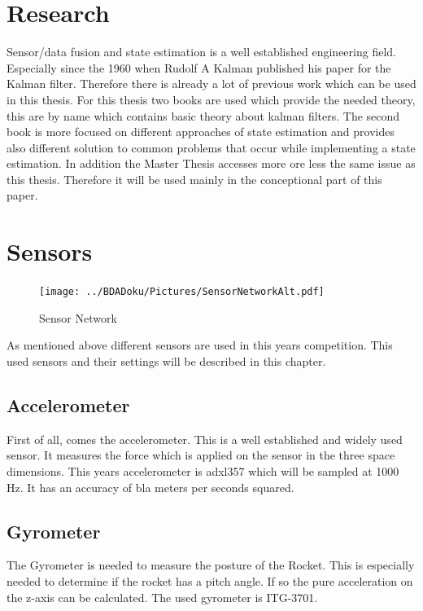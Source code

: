  \section{Research}
 Sensor/data fusion and state estimation is a well established engineering field.
 Especially since the 1960 when Rudolf A Kalman published his paper for the Kalman filter.
 Therefore there is already a lot of previous work which can be used in this thesis.
 For this thesis two books are used which provide the needed theory, this are by name
 \cite{DavidWSchultz2004} which contains basic theory about kalman filters. The second book
 \cite{SimonDan2006Ose:} is more focused on different approaches of state estimation and
 provides also different solution to common problems that occur while implementing a state estimation.
 In addition the Master Thesis \cite{BryanTongMinh2012} accesses more ore less the same issue as this thesis.
 Therefore it will be used mainly in the conceptional part of this paper.
 
 
 \section{Sensors}
 \begin{figure}[h!]
  \centering
  \texttt{[image: ../BDADoku/Pictures/SensorNetworkAlt.pdf]}
  \caption{Sensor Network}
  \label{fig:SensorNetwork}
 \end{figure}

 As mentioned above different sensors are used in this years competition.
 This used sensors and their settings will be described in this chapter.
 
 \subsection{Accelerometer}
 First of all, comes the accelerometer. This is a well established and widely used sensor. It measures the force which is applied on the sensor in the three
 space dimensions. 
 This years accelerometer is adxl357 which will be sampled at 1000 Hz. It has an accuracy of bla meters per seconds squared. 
 
 \subsection{Gyrometer}
 The Gyrometer is needed to measure the posture of the Rocket. This is especially needed to determine if the rocket has a pitch angle. If so the pure
 acceleration on the z-axis can be calculated. The used gyrometer is ITG-3701.
 

